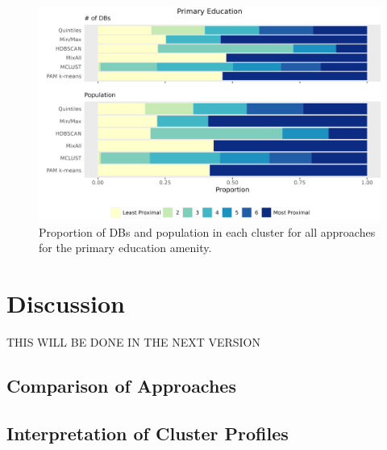\documentclass[11pt, a4paper]{article}
\begin{document}
\begin{figure}[H]
\centering
\includegraphics[width=\textwidth]{./barplot_comparison/Primary Education_barplot.png}
\caption[Primary education profile barplot]{Proportion of DBs and population in each cluster for all approaches for the primary education amenity.}\label{prieducbarplot}
\end{figure}










\pagebreak 
\section{Discussion}




THIS WILL BE DONE IN THE NEXT VERSION  







\subsection{Comparison of Approaches}


















\subsection{Interpretation of Cluster Profiles}
\end{document}
